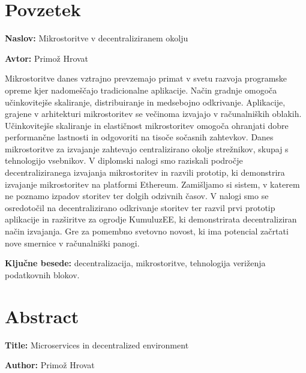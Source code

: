 \documentclass[a4paper, 12pt]{book}
\newcommand{\ttitle}{Mikrostoritve v decentraliziranem okolju}
\newcommand{\ttitleEn}{Microservices in decentralized environment}
\newcommand{\tauthor}{Primož Hrovat}
\newcommand{\tkeywords}{decentralizacija, mikrostoritve, tehnologija veriženja podatkovnih blokov}
\newcommand{\clearemptydoublepage}{\newpage{\pagestyle{empty}\cleardoublepage}}
\begin{document}
\clearemptydoublepage

\chapter*{Povzetek}

\noindent\textbf{Naslov:} \ttitle
\bigskip

\noindent\textbf{Avtor:} \tauthor
\bigskip

\noindent

Mikrostoritve danes vztrajno prevzemajo primat v svetu razvoja programske opreme kjer nadomeščajo tradicionalne aplikacije. Način gradnje omogoča učinkovitejše skaliranje, distribuiranje in medsebojno odkrivanje.
Aplikacije, grajene v arhitekturi mikrostoritev se večinoma izvajajo v ra\-ču\-nal\-ni\-ških oblakih.
Učinkovitejše skaliranje in elastičnost mikrostoritev omogoča ohranjati dobre performančne lastnosti in odgovoriti na tisoče sočasnih zahtevkov.
Danes mikrostoritve za izvajanje zahtevajo centralizirano okolje strežnikov, skupaj s tehnologijo vsebnikov.
V diplomski nalogi smo raziskali področje decentraliziranega izvajanja mikrostoritev in razvili prototip, ki demonstrira izvajanje mikrostoritev na platformi Ethereum.
Zamišljamo si sistem, v katerem ne poznamo izpadov storitev ter dolgih odzivnih časov.
V nalogi smo se osredotočil na decentralizirano odkrivanje storitev ter razvil prvi prototip aplikacije in razširitve za ogrodje KumuluzEE, ki demonstrirata decentraliziran način izvajanja.
Gre za pomembno svetovno novost, ki ima potencial začrtati nove smernice v računalniški panogi.

\bigskip

\noindent\textbf{Ključne besede:} \tkeywords.
\clearemptydoublepage

\chapter*{Abstract}

\noindent\textbf{Title:} \ttitleEn
\bigskip

\noindent\textbf{Author:} \tauthor
\bigskip

\noindent 
\end{document}
